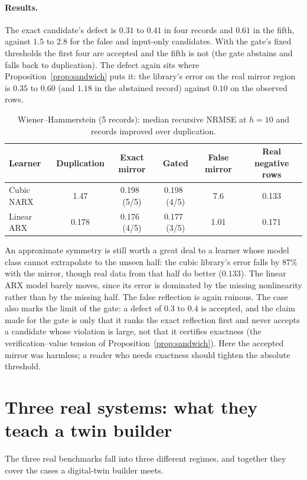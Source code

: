\paragraph{Results.} The exact candidate's defect is $0.31$ to $0.41$ in four records and $0.61$ in the fifth, against $1.5$ to $2.8$ for the false and input-only candidates. With the gate's fixed thresholds the first four are accepted and the fifth is not (the gate abstains and falls back to duplication). The defect again sits where Proposition~\ref{prop:sandwich} puts it: the library's error on the real mirror region is $0.35$ to $0.60$ (and $1.18$ in the abstained record) against $0.10$ on the observed rows.
\begin{table}[H]\centering\small
\caption{Wiener--Hammerstein (5 records): median recursive NRMSE at $h=10$ and records improved over duplication.}\label{tab:wh}
\begin{tabular}{lccccc}
\toprule
Learner & Duplication & Exact mirror & Gated & False mirror & Real negative rows\\
\midrule
Cubic NARX & 1.47 & 0.198 \,(5/5) & 0.198 \,(4/5) & 7.6 & 0.133\\
Linear ARX & 0.178 & 0.176 \,(4/5) & 0.177 \,(3/5) & 1.01 & 0.171\\
\bottomrule
\end{tabular}
\end{table}
An approximate symmetry is still worth a great deal to a learner whose model class cannot extrapolate to the unseen half: the cubic library's error falls by $87\%$ with the mirror, though real data from that half do better ($0.133$). The linear ARX model barely moves, since its error is dominated by the missing nonlinearity rather than by the missing half. The false reflection is again ruinous. The case also marks the limit of the gate: a defect of $0.3$ to $0.4$ is accepted, and the claim made for the gate is only that it ranks the exact reflection first and never accepts a candidate whose violation is large, not that it certifies exactness (the verification--value tension of Proposition~\ref{prop:sandwich}). Here the accepted mirror was harmless; a reader who needs exactness should tighten the absolute threshold.

\section{Three real systems: what they teach a twin builder}\label{app:realsynth}
The three real benchmarks fall into three different regimes, and together they cover the cases a digital-twin builder meets.

